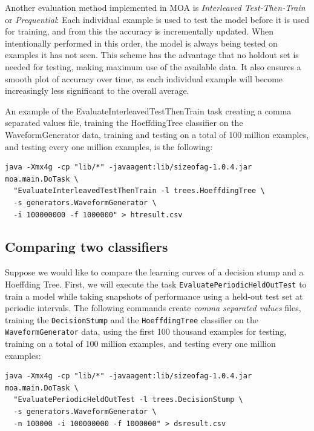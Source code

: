 \documentclass[a4paper,12pt,twoside]{book}
\begin{document}
Another evaluation method implemented in MOA is \emph{Interleaved Test-Then-Train}  or \emph{Prequential}:
 Each individual example is used to test the model
before it is used for training, and from this the accuracy is incrementally
updated. When intentionally performed in this order, the model is always
being tested on examples it has not seen. This scheme has the advantage that
no holdout set is needed for testing, making maximum use of the available
data. It also ensures a smooth plot of accuracy over time, as each individual
example will become increasingly less significant to the overall average.

An example of the EvaluateInterleavedTestThenTrain task  
creating a comma separated values file, training the
HoeffdingTree classifier on the WaveformGenerator data, training and testing on a total of 100 million
examples, and testing every one million examples, is the following:

\begin{footnotesize}\begin{verbatim}
java -Xmx4g -cp "lib/*" -javaagent:lib/sizeofag-1.0.4.jar moa.main.DoTask \
  "EvaluateInterleavedTestThenTrain -l trees.HoeffdingTree \
  -s generators.WaveformGenerator \
  -i 100000000 -f 1000000" > htresult.csv
\end{verbatim}
\end{footnotesize}

\subsection{Comparing two classifiers}

Suppose we would like to compare the learning curves of a decision stump and a Hoeffding Tree.
First, we will execute the
 task \verb+EvaluatePeriodicHeldOutTest+ to train a model while taking snapshots of performance using a held-out test set at periodic intervals.
The following commands create {\em comma separated values} files, training the \verb+DecisionStump+ and the \verb+HoeffdingTree+ classifier on the \verb+WaveformGenerator+ data, using the first 100 thousand examples for testing, training on a total of 100 million examples, and testing every one million examples:

\begin{footnotesize}\begin{verbatim}
java -Xmx4g -cp "lib/*" -javaagent:lib/sizeofag-1.0.4.jar moa.main.DoTask \
  "EvaluatePeriodicHeldOutTest -l trees.DecisionStump \
  -s generators.WaveformGenerator \
  -n 100000 -i 100000000 -f 1000000" > dsresult.csv
\end{verbatim}\end{footnotesize}
\end{document}
